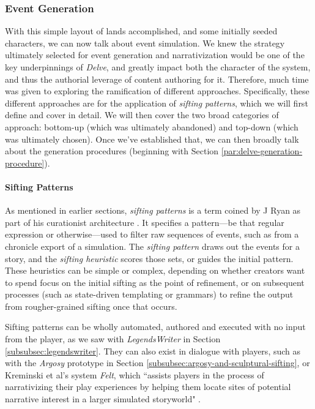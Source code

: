 \subsubsection{Event Generation}\label{subsubsec:event-generation}

With this simple layout of lands accomplished, and some initially seeded characters, we can now talk about event simulation. We knew the strategy ultimately selected for event generation and narrativization would be one of the key underpinnings of \textit{Delve}, and greatly impact both the character of the system, and thus the authorial leverage of content authoring for it. Therefore, much time was given to exploring the ramification of different approaches. Specifically, these different approaches are for the application of \textit{sifting patterns}, which we will first define and cover in detail. We will then cover the two broad categories of approach: bottom-up (which was ultimately abandoned) and top-down (which was ultimately chosen). Once we've established that, we can then broadly talk about the generation procedures (beginning with Section \ref{par:delve-generation-procedure}).

\paragraph{Sifting Patterns}\label{par:sifting-patterns}

As mentioned in earlier sections, \textit{sifting patterns} is a term coined by J Ryan as part of his curationist architecture \cite[p.~249-250]{ryan2018curating}. It specifies a pattern---be that regular expression or otherwise---used to filter raw sequences of events, such as from a chronicle export of a simulation. The \textit{sifting pattern} draws out the events for a story, and the \textit{sifting heuristic} scores those sets, or guides the initial pattern. These heuristics can be simple or complex, depending on whether creators want to spend focus on the initial sifting as the point of refinement, or on subsequent processes (such as state-driven templating or grammars) to refine the output from rougher-grained sifting once that occurs.

Sifting patterns can be wholly automated, authored and executed with no input from the player, as we saw with \textit{LegendsWriter} in Section \ref{subsubsec:legendswriter}. They can also exist in dialogue with players, such as with the \textit{Argosy} prototype in Section \ref{subsubsec:argosy-and-sculptural-sifting}, or Kreminski et al's system \textit{Felt}, which ``assists players in the process of narrativizing their play experiences by helping them locate sites of potential narrative interest in a larger simulated storyworld" \cite{kreminski2019felt}.

